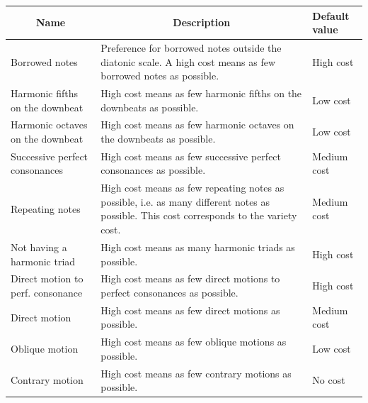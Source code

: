 \begin{table}[!h]
    \footnotesize
    \begin{adjustbox}{center}
        \begin{tabular}{|m{}|m{}|m{}<{\centering}|}
        \hline
        \multicolumn{1}{|c|}{\textbf{Name}} &
          \multicolumn{1}{c|}{\textbf{Description}} &
          \textbf{Default value} \\ \hline
        \cellcolor[HTML]{C8D6FF}Borrowed notes &
          Preference for borrowed notes outside the diatonic scale. A high cost means as few borrowed notes as possible. &
          High cost \\ \hline
        \cellcolor[HTML]{C8D6FF}Harmonic fifths on the downbeat &
          High cost means as few harmonic fifths on the downbeats as possible. &
          Low cost \\ \hline
        \cellcolor[HTML]{C8D6FF}Harmonic octaves on the downbeat &
          High cost means as few harmonic octaves on the downbeats as possible. &
          Low cost \\ \hline
        \cellcolor[HTML]{C8D6FF}Successive perfect consonances &
          High cost means as few successive perfect consonances as possible.&
          Medium cost \\ \hline
        \cellcolor[HTML]{C8D6FF}Repeating notes &
          High cost means as few repeating notes as possible, i.e. as many different notes as possible. This cost corresponds to the variety cost.&
          Medium cost \\ \hline
        \cellcolor[HTML]{C8D6FF}Not having a harmonic triad &
          High cost means as many harmonic triads as possible.&
          High cost \\ \hline
        \cellcolor[HTML]{C8D6FF}Direct motion to perf. consonance &
          High cost means as few direct motions to perfect consonances as possible.&
          High cost \\ \hline
        \cellcolor[HTML]{C8D6FF}Direct motion &
          High cost means as few direct motions as possible. &
          Medium cost \\ \hline
        \cellcolor[HTML]{C8D6FF}Oblique motion &
          High cost means as few oblique motions as possible. &
          Low cost \\ \hline
        \cellcolor[HTML]{C8D6FF}Contrary motion &
          High cost means as few contrary motions as possible. &
          No cost \\ \hline

\end{tabular}
\end{adjustbox}
\end{table}
